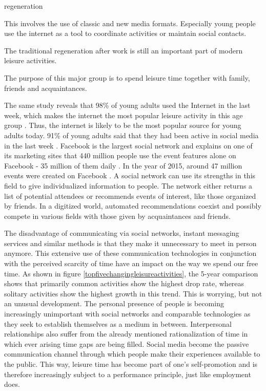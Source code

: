 \documentclass[12pt,numbers=noenddot,parskip,bibliography=totocnumbered,listof=totocnumbered,draft]{scrreprt}
\begin{document}
\begin{labeling}{regeneration}
\item[media use] This involves the use of classic and new media formats. Especially young people use the internet as a tool to coordinate activities or maintain social contacts.
\item[regeneration] The traditional regeneration after work is still an important part of modern leisure activities.
\item[socialize] The purpose of this major group is to spend leisure time together with family, friends and acquaintances.
\end{labeling}

The same study reveals that 98\% of young adults used the Internet in the last week, which makes the internet the most popular leisure activity in this age group \citep{freizeitmonitor2016}. Thus, the internet is likely to be the most popular source for young adults today. 91\% of young adults said that they had been active in social media in the last week \cite{freizeitmonitor2016}. Facebook is the largest social network and explains on one of its marketing sites that 440 million people use the event features alone on Facebook - 35 million of them daily \citep{facebook2017}. In the year of 2015, around 47 million events were created on Facebook \citep{facebook2017}. A social network can use its strengths in this field to give individualized information to people. The network either returns a list of potential attendees or recommends events of interest, like those organized by friends. In a digitized world, automated recommendations coexist and possibly compete in various fields with those given by acquaintances and friends.

The disadvantage of communicating via social networks, instant messaging services and similar methods is that they make it unnecessary to meet in person anymore. This extensive use of these communication technologies in conjunction with the perceived scarcity of time have an impact on the way we spend our free time. As shown in figure \ref{topfivechangingleisureactivities}, the 5-year comparison shows that primarily common activities show the highest drop rate, whereas solitary activities show the highest growth in this trend. This is worrying, but not an unusual development. The personal presence of people is becoming increasingly unimportant with social networks and comparable technologies as they seek to establish themselves as a medium in between. Interpersonal relationships also suffer from the already mentioned rationalization of time in which ever arising time gaps are being filled. Social media become the passive communication channel through which people make their experiences available to the public. This way, leisure time has become part of one's self-promotion and is therefore increasingly subject to a performance principle, just like employment does.
\end{document}
